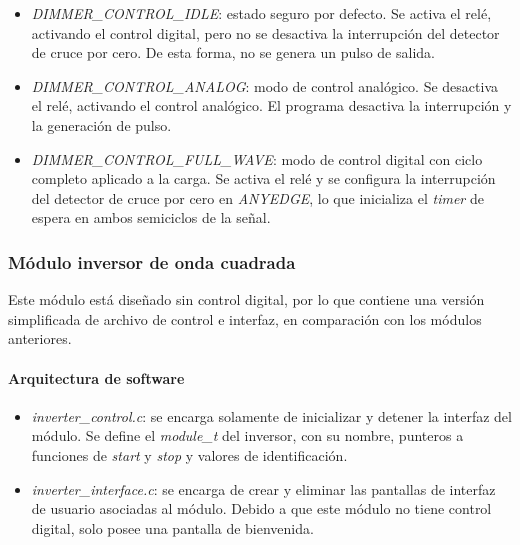 \begin{itemize}[noitemsep]
    \item \textit{DIMMER\_CONTROL\_IDLE}: estado seguro por defecto. Se activa el relé, activando el control digital, pero no se desactiva la interrupción del detector de cruce por cero. De esta forma, no se genera un pulso de salida.
    \item \textit{DIMMER\_CONTROL\_ANALOG}: modo de control analógico. Se desactiva el relé, activando el control analógico. El programa desactiva la interrupción y la generación de pulso.
    \item \textit{DIMMER\_CONTROL\_FULL\_WAVE}: modo de control digital con ciclo completo aplicado a la carga. Se activa el relé y se configura la interrupción del detector de cruce por cero en \textit{ANYEDGE}, lo que inicializa el \textit{timer} de espera en ambos semiciclos de la señal.
\end{itemize}

\subsubsection{Módulo inversor de onda cuadrada}

Este módulo está diseñado sin control digital, por lo que contiene una versión simplificada de archivo de control e interfaz, en comparación con los módulos anteriores.

\paragraph{Arquitectura de software}

\begin{itemize}[noitemsep]
    \item \textit{inverter\_control.c}: se encarga solamente de inicializar y detener la interfaz del módulo. Se define el \textit{module\_t} del inversor, con su nombre, punteros a funciones de \textit{start} y \textit{stop} y valores de identificación.
    \item \textit{inverter\_interface.c}: se encarga de crear y eliminar las pantallas de interfaz de usuario asociadas al módulo. Debido a que este módulo no tiene control digital, solo posee una pantalla de bienvenida.
\end{itemize}